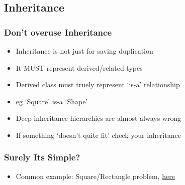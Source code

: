 \hypertarget{inheritance-1}{%
\subsection{Inheritance}\label{inheritance-1}}

\hypertarget{dont-overuse-inheritance}{%
\subsubsection{Don't overuse
Inheritance}\label{dont-overuse-inheritance}}

\begin{itemize}
\tightlist
\item
  Inheritance is not just for saving duplication
\item
  It MUST represent derived/related types
\item
  Derived class must truely represent `is-a' relationship
\item
  eg `Square' is-a `Shape'
\item
  Deep inheritance hierarchies are almost always wrong
\item
  If something `doesn't quite fit' check your inheritance
\end{itemize}

\hypertarget{surely-its-simple}{%
\subsubsection{Surely Its Simple?}\label{surely-its-simple}}

\begin{itemize}
\tightlist
\item
  Common example: Square/Rectangle problem,
  \href{http://www.oodesign.com/liskov-s-substitution-principle.html}{here}
\end{itemize}

